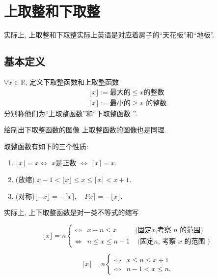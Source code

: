 \documentclass{ctexart}
\begin{document}
\section{上取整和下取整} 
\label{sec:intro}

实际上, 上取整和下取整实际上英语是对应着房子的``天花板''和``地板''. 


\subsection{基本定义} 

\begin{definition}[上取整和下取整]
    $\forall x \in \mathbb{R}$, 定义下取整函数和上取整函数
    \begin{align*}
    \lfloor x\rfloor:= \text{最大的} \leqslant x \text{的整数}\\
    \lceil x\rceil := \text{最小的} \geqslant x\text{ 的整数}
    \end{align*}
    分别称他们为``上取整函数''和``下取整函数 ''.
    
\end{definition}

\begin{example}绘制出下取整函数的图像
   上取整函数的图像也是同理.  
\end{example}

\begin{prop}
    取整函数有如下的三个性质: 

    \begin{enumerate}
        \item $\lfloor x\rfloor=x \iff$ $x$是正数 $\iff $ $\lceil x\rceil=x$.
        \item (放缩) $x-1<\lfloor x\rfloor \leqslant x \leqslant\lceil x\rceil<x+1$.
        \item (对称)$\lfloor-x\rfloor=-\lceil x\rceil, \quad F x\rceil=-\lfloor x\rfloor$.
    \end{enumerate}
    
\end{prop}

\begin{prop}
    实际上, 上下取整函数是对一类不等式的缩写

    $$
\lfloor x\rfloor=n\left\{\begin{array}{lll}
    \iff & x-n \leqslant x & \text {(固定}x\text{,考察 } n \text { 的范围) } \\
\iff & n \leqslant x \leqslant n+1 & \text { (固定}n\text{, 考察 } x \text { 的范围 })
\end{array}\right.
$$

$$
\lceil x\rceil=n \begin{cases}\iff & x \leqslant n \leqslant x+1 \\ \iff & n-1<x \leqslant n .\end{cases}
$$

    
\end{prop}
\end{document}
